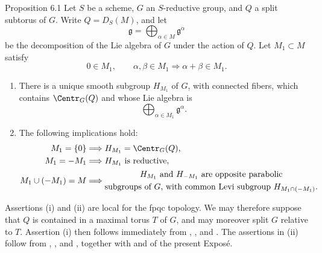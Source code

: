 
\begin{sgastatement}{Proposition 6.1}
Let \(S\) be a scheme, \(G\) an \(S\)-reductive group, and \(Q\) a
split subtorus of \(G\).  Write \(Q=D_S(M)\), and let
\[
 \mathfrak g=\bigoplus_{\alpha\in M}\mathfrak g^\alpha
\]
be the decomposition of the Lie algebra of \(G\) under the action of
\(Q\).
Let \(M_1\subset M\) satisfy
\[
 0\in M_1,\qquad
 \alpha,\beta\in M_1\Longrightarrow\alpha+\beta\in M_1.
\]
\begin{enumerate}[label=\textup{(\roman*)}]
\item There is a unique smooth subgroup \(H_{M_1}\) of \(G\), with
connected fibers, which contains \(\Centr_G(Q)\) and whose Lie
algebra is
\[
 \bigoplus_{\alpha\in M_1}\mathfrak g^\alpha.
\]
\item The following implications hold:
\[
\begin{aligned}
 M_1=\{0\}
   &\Longrightarrow H_{M_1}=\Centr_G(Q),\\
 M_1=-M_1
   &\Longrightarrow H_{M_1}\text{ is reductive},\\
 M_1\cup(-M_1)=M
   &\Longrightarrow
   \begin{gathered}
    H_{M_1}\text{ and }H_{-M_1}\text{ are opposite parabolic}\\
    \text{subgroups of \(G\), with common Levi subgroup }
    H_{M_1\cap(-M_1)}.
   \end{gathered}
\end{aligned}
\]
\end{enumerate}
\end{sgastatement}

Assertions \textup{(i)} and \textup{(ii)} are local for the fpqc
topology.  We may therefore suppose that \(Q\) is contained in a
maximal torus \(T\) of \(G\), and may moreover split \(G\) relative
to \(T\).  Assertion \textup{(i)} then follows immediately from
, , and .  The assertions in
\textup{(ii)} follow from , , and ,
together with  and  of the present Exposé.

